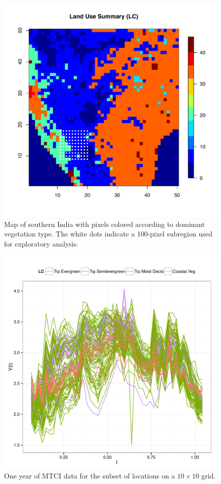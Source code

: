 \begin{figure}
	[htbp] 
	
	\centering 
	\includegraphics[width=\linewidth]{Images-future-work/LCAndSubregion_SIX.pdf} \caption{Map of southern India with pixels colored according to dominant vegetation type. The white dots indicate a 100-pixel subregion used for exploratory analysis.} \label{fig:land use map} 
\end{figure}
\begin{figure}
	[htbp] 
	
	\centering 
	\includegraphics[width=0.6 
	\textwidth]{Images-future-work/region6-curves.pdf} \caption{One year of MTCI data for the subset of locations on a $10\times 10$ grid.} \label{fig:region6 curves} 
\end{figure}
